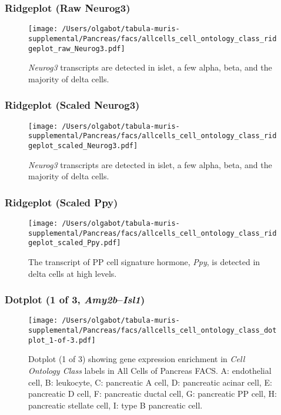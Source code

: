 \clearpage

\subsubsection{Ridgeplot (Raw Neurog3)}
\begin{figure}[h]
\centering
\texttt{[image: /Users/olgabot/tabula-muris-supplemental/Pancreas/facs/allcells\_cell\_ontology\_class\_ridgeplot\_raw\_Neurog3.pdf]}

\caption{\emph{Neurog3} transcripts are detected in islet, a few alpha, beta, and the majority of delta cells.
}
\end{figure}


\clearpage

\subsubsection{Ridgeplot (Scaled Neurog3)}
\begin{figure}[h]
\centering
\texttt{[image: /Users/olgabot/tabula-muris-supplemental/Pancreas/facs/allcells\_cell\_ontology\_class\_ridgeplot\_scaled\_Neurog3.pdf]}

\caption{\emph{Neurog3} transcripts are detected in islet, a few alpha, beta, and the majority of delta cells.
}
\end{figure}


\clearpage

\subsubsection{Ridgeplot (Scaled Ppy)}
\begin{figure}[h]
\centering
\texttt{[image: /Users/olgabot/tabula-muris-supplemental/Pancreas/facs/allcells\_cell\_ontology\_class\_ridgeplot\_scaled\_Ppy.pdf]}

\caption{The transcript of PP cell signature hormone, \emph{Ppy}, is detected in delta cells at high levels.
}
\end{figure}


\clearpage

\subsubsection{Dotplot (1 of 3, \emph{Amy2b}--\emph{Isl1})}
\begin{figure}[h]
\centering
\texttt{[image: /Users/olgabot/tabula-muris-supplemental/Pancreas/facs/allcells\_cell\_ontology\_class\_dotplot\_1-of-3.pdf]}

\caption{ Dotplot (1 of 3)  showing gene expression enrichment in \emph{Cell Ontology Class} labels in All Cells of Pancreas FACS. A: endothelial cell, B: leukocyte, C: pancreatic A cell, D: pancreatic acinar cell, E: pancreatic D cell, F: pancreatic ductal cell, G: pancreatic PP cell, H: pancreatic stellate cell, I: type B pancreatic cell.}
\end{figure}


